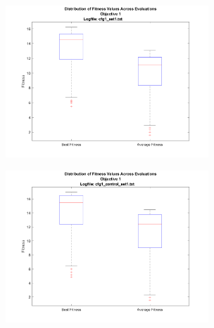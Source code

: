 \documentclass[11pt]{article}
\begin{document}
\begin{figure}[H]
\begin{minipage}{.5\textwidth}
  \includegraphics[width=3in]{assn1d_boxplot_cfg1_set1_obj1.png}
  \label{fig:boxplot_control_obj1}
\end{minipage}%
\begin{minipage}{.5\textwidth}
  \includegraphics[width=3in]{assn1d_boxplot_cfg1_control_set1_obj1.png}
  \label{fig:boxplot_expl_obj1}
\end{minipage}
\end{figure}
\end{document}
